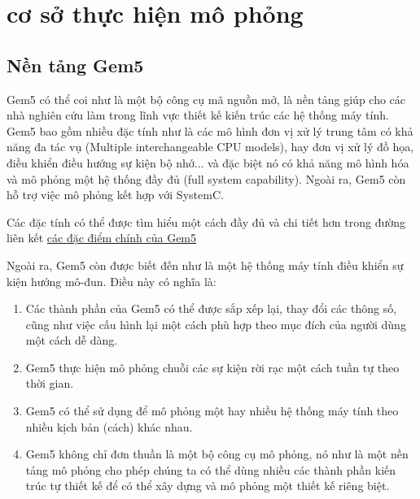 \documentclass{article}
\begin{document}
\section{cơ sở thực hiện mô phỏng} \label{base-on}
\subsection{Nền tảng Gem5} \label{gem5Intro}
Gem5 có thể coi như là một bộ công cụ mã nguồn mở, là nền tảng giúp cho các nhà nghiên cứu làm trong lĩnh vực thiết kế kiến trúc các hệ thống máy tính. Gem5 bao gồm nhiều đặc tính như là các mô hình đơn vị xử lý trung tâm có khả năng đa tác vụ (Multiple interchangeable CPU models), hay đơn vị xử lý đồ họa, điều khiển điều hướng sự kiện bộ nhớ... và đặc biệt nó có khả năng mô hình hóa và mô phỏng một hệ thống đầy đủ (full system capability). Ngoài ra, Gem5 còn hỗ trợ việc mô phỏng kết hợp với SystemC.

Các đặc tính có thể được tìm hiểu một cách đầy đủ và chi tiết hơn trong đường liên kết \href{http://gem5.org/Main_Page}{các đặc điểm chính của Gem5}

Ngoài ra, Gem5 còn được biết đến như là một hệ thống máy tính điều khiển sự kiện hướng mô-đun. Điều này có nghĩa là:

\begin{enumerate}
	\item Các thành phần của Gem5 có thể được sắp xếp lại, thay đổi các thông số, cũng như việc cấu hình lại một cách phù hợp theo mục đích của người dùng một cách dễ dàng.
	\item Gem5 thực hiện mô phỏng chuỗi các sự kiện rời rạc một cách tuần tự theo thời gian.
	\item Gem5 có thể sử dụng để mô phỏng một hay nhiều hệ thống máy tính theo nhiều kịch bản (cách) khác nhau.
	\item Gem5 không chỉ đơn thuần là một bộ công cụ mô phỏng, nó như là một nền tảng mô phỏng cho phép chúng ta có thể dùng nhiều các thành phần kiến trúc tự thiết kế để có thể xây dựng và mô phỏng một thiết kế riêng biệt. 
\end{enumerate}
\end{document}
